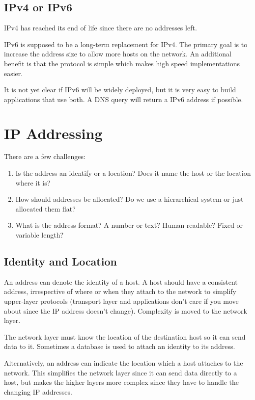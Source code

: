 \subsection{IPv4 or IPv6}\label{sub:ipv4_or_ipv6}

IPv4 has reached its end of life since there are no addresses left.

IPv6 is supposed to be a long-term replacement for IPv4.
The primary goal is to increase the address size to allow more hosts on the network.
An additional benefit is that the protocol is simple which makes high speed implementations easier.

It is not yet clear if IPv6 will be widely deployed, but it is very easy to build applications that use both.
A DNS query will return a IPv6 address if possible.

\section{IP Addressing}\label{sec:ip_addressing}

There are a few challenges:
\begin{enumerate}
    \item Is the address an identify or a location? Does it name the host or the location where it is?
    \item How should addresses be allocated? Do we use a hierarchical system or just allocated them flat?
    \item What is the address format? A number or text? Human readable? Fixed or variable length?
\end{enumerate}

\subsection{Identity and Location}\label{sub:identity_and_locaiton}

An address can denote the identity of a host.
A host should have a consistent address, irrespective of where or when they attach to the network to simplify upper-layer protocols (transport layer and applications don't care if you move about since the IP address doesn't change).
Complexity is moved to the network layer.

The network layer must know the location of the destination host so it can send data to it.
Sometimes a database is used to attach an identity to its address.

Alternatively, an address can indicate the location which a host attaches to the network.
This simplifies the network layer since it can send data directly to a host, but makes the higher layers more complex since they have to handle the changing IP addresses.

